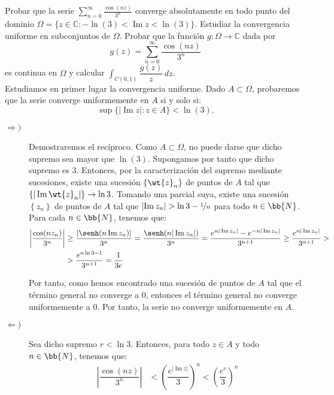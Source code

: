 \documentclass[12pt]{article}
\renewcommand{\Im}{\operatorname{Im}}
\begin{document}
    \newpage
    \setcounter{ejercicio}{0}

    \begin{ejercicio}[4 puntos]
        Probar que la serie $\displaystyle \sum_{n=0}^{\infty} \frac{\cos(nz)}{3^n}$ converge absolutamente en todo punto del dominio $\Omega = \{ z \in \mathbb{C} : -\ln(3) < \Im z < \ln(3) \}$. Estudiar la convergencia uniforme en subconjuntos de $\Omega$. Probar que la función $g : \Omega \to \mathbb{C}$ dada por
        \[
            g(z) = \sum_{n=0}^{\infty} \frac{\cos(nz)}{3^n}
        \]
        es continua en $\Omega$ y calcular $\displaystyle \int_{C(0,1)} \dfrac{g(z)}{z} \, dz$.\\

        Estudiamos en primer lugar la convergencia uniforme. Dado $A\subset \Omega$, probaremos que la serie converge uniformemente en $A$ si y solo si:
        \[
            \sup\{|\Im z| : z\in A\} < \ln(3).
        \]
        \begin{description}
            \item[$\Longrightarrow)$] Demostraremos el recíproco. Como $A\subset \Omega$, no puede darse que dicho supremo sea mayor que $\ln(3)$. Supongamos por tanto que dicho supremo es $3$. Entonces, por la caracterización del supremo mediante sucesiones, existe una sucesión $\left\{\wt{z}_n\right\}$ de puntos de $A$ tal que $\left\{|\Im \wt{z}_n|\right\}\to \ln 3$. Tomando una parcial suya, existe una sucesión $\left\{z_n\right\}$ de puntos de $A$ tal que $\left|\Im z_n\right|>\ln 3 - \nicefrac{1}{n}$ para todo $n\in \bb{N}$.\\
            
            Para cada $n\in \bb{N}$, tenemos que:
            \begin{align*}
                \left|\dfrac{\cos(nz_n)}{3^n}\right| &\geq \dfrac{\left|\senh(n\Im z_n)\right|}{3^{n}}
                = \dfrac{\senh(n|\Im z_n|)}{3^{n}}
                = \dfrac{e^{n|\Im z_n|}-e^{-n|\Im z_n|}}{3^{n+1}} \geq \dfrac{e^{n|\Im z_n|}}{3^{n+1}}
                > \\
                &> \dfrac{e^{n\ln 3 -1}}{3^{n+1}}
                = \dfrac{1}{3e}
            \end{align*}

            Por tanto, como hemos encontrado una sucesión de puntos de $A$ tal que el término general no converge a $0$, entonces el término general no converge uniformemente a $0$. Por tanto, la serie no converge uniformemente en $A$.

            \item[$\Longleftarrow)$] Sea dicho supremo $r<\ln 3$. Entonces, para todo $z\in A$ y todo $n\in \bb{N}$, tenemos que:
            \begin{align*}
                \left|\dfrac{\cos(nz)}{3^n}\right| &<\left(\dfrac{e^{|\Im z|}}{3}\right)^n
                < \left(\dfrac{e^{r}}{3}\right)^n
            \end{align*}


\end{description}
\end{ejercicio}
\end{document}
